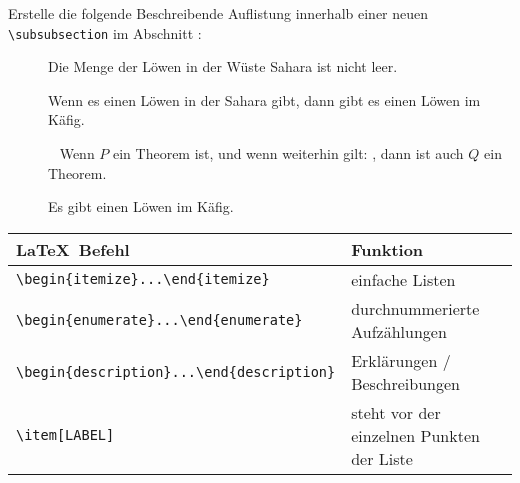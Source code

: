 \documentclass["WS\space 16-17\space -\space LaTeX-Kurs\space -\space Praesentation\space -\space 2.tex"]{subfiles}
\begin{document}
\begin{frame}[fragile]
	\vspace{-0.3cm}
	\begin{Aufgabe}
		Erstelle die folgende Beschreibende Auflistung innerhalb einer neuen \lstinline[basicstyle=\normalfont\normalsize]|\subsubsection| \textrm{} im Abschnitt \textrm{}:
	\end{Aufgabe}
	\begin{outputbox}
		\vspace{-0.2cm}
		\begin{description}
			\item[{\makebox[0.5cm]{}}]
				Die Menge der Löwen in der Wüste Sahara ist nicht leer.
			\item[{\makebox[0.5cm]{}}]
				Wenn es einen Löwen in der Sahara gibt, dann gibt es einen Löwen im Käfig.
			\item[{\makebox[0.5cm]{}}]\ \newline
				Wenn $P$ ein Theorem ist, und wenn weiterhin gilt: , dann ist auch $Q$ ein Theorem.
			\item[{\makebox[0.5cm]{}}]
				Es gibt einen Löwen im Käfig.
		\end{description}
		\vspace{-0.2cm}
	\end{outputbox}
	\btVFill\Befehle
	\begin{center}
		\begin{tabular}{ll}
			\toprule
			\LaTeX\ Befehl										&	Funktion									\\ \midrule
			\lstinline|\begin{itemize}...\end{itemize}|			&	einfache Listen								\\
			\lstinline|\begin{enumerate}...\end{enumerate}|		&	durchnummerierte Aufzählungen				\\
			\lstinline|\begin{description}...\end{description}|	&	Erklärungen / Beschreibungen				\\
			\lstinline|\item[LABEL]|							&	steht vor der einzelnen Punkten der Liste	\\
			\bottomrule
		\end{tabular}
	\end{center}
	\vspace{0.1cm}
\end{frame}
\end{document}
